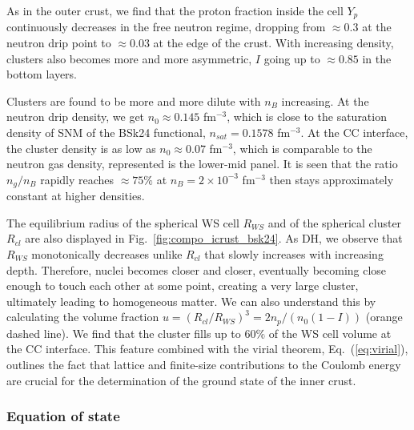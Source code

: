 As in the outer crust, we find that the proton fraction inside the cell $Y_p$ 
continuously decreases in the free neutron regime, dropping from $\approx 0.3$ 
at the neutron drip point to $\approx 0.03$ at the edge of the crust. With
increasing density, clusters also becomes more and more asymmetric, $I$ going
up to $\approx 0.85$ in the bottom layers.

Clusters are found to be more and more dilute with $n_B$ increasing. At the
neutron drip density, we get $n_0 \approx 0.145$ fm$^{-3}$, which is close to the
saturation density of SNM of the BSk24 functional, $n_{sat} = 0.1578$ 
fm$^{-3}$. At the CC interface, the cluster density is as low as $n_0
\approx 0.07$ fm$^{-3}$, which is comparable to the neutron gas density, 
represented is the lower-mid panel. It is seen that the ratio $n_g/n_B$ rapidly
reaches $\approx 75\%$ at $n_B =2\times 10^{-3}$ fm$^{-3}$ then stays
approximately constant at higher densities.

The equilibrium radius of the spherical WS cell $R_{WS}$ and of the spherical 
cluster $R_{cl}$ are also displayed in Fig.~\ref{fig:compo_icrust_bsk24}. As
DH, we observe that $R_{WS}$ monotonically decreases unlike $R_{cl}$ that
slowly increases with increasing depth. Therefore, nuclei becomes closer and closer,
eventually becoming close enough to touch each other at some point, creating a
very large cluster, ultimately leading to homogeneous matter. We can also
understand this by calculating the volume fraction
$u=(R_{cl}/R_{WS})^3 = 2n_p/(n_0(1-I))$ (orange dashed line). We find that the 
cluster fills up to $60\%$ of the WS cell volume at the CC interface. This 
feature combined with the virial theorem, Eq.~(\ref{eq:virial}), outlines the 
fact that lattice and finite-size contributions to the Coulomb energy are 
crucial for the determination of the ground state of the inner crust.

\subsubsection{Equation of state}\label{subsubsec:icrusteos}

